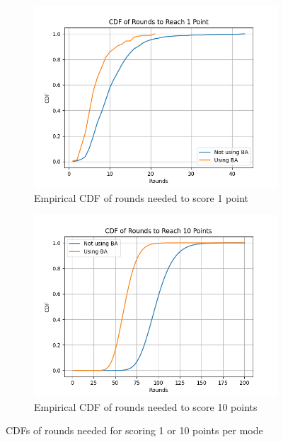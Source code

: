 \documentclass{article}
\begin{document}
\begin{figure}[H]
    \centering
    \begin{subfigure}{0.45\textwidth}
        \centering
        \includegraphics[width=\linewidth]{cdf_rounds_to_score_1.png}
        \caption{Empirical CDF of rounds needed to score 1 point}
    \end{subfigure}
    \hfill
    \begin{subfigure}{0.45\textwidth}
        \centering
        \includegraphics[width=\linewidth]{cdf_rounds_to_score_10.png}
        \caption{Empirical CDF of rounds needed to score 10 points}
    \end{subfigure}

    \caption{CDFs of rounds needed for scoring 1 or 10 points per mode}
    \label{fig:cdf_rounds}
\end{figure}
\end{document}

